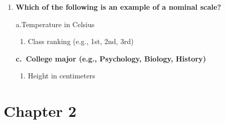 \documentclass[
  letterpaper,
  DIV=11,
  numbers=noendperiod]{scrreprt}
\providecommand{\tightlist}{%
  \setlength{\itemsep}{0pt}\setlength{\parskip}{0pt}}
\begin{document}
\begin{enumerate}
  \textbf{b. Internal validity}

  \begin{enumerate}
  \def\labelenumii{\alph{enumii}.}
  \setcounter{enumii}{2}
  \item
    Construct validity
  \item
    Content validity
  \end{enumerate}
\item
  \textbf{Which of the following is an example of a nominal scale?}

  a.Temperature in Celsius

  \begin{enumerate}
  \def\labelenumii{\alph{enumii}.}
  \setcounter{enumii}{1}
  \tightlist
  \item
    Class ranking (e.g., 1st, 2nd, 3rd)
  \end{enumerate}

  \textbf{c.~College major (e.g., Psychology, Biology, History)}

  \begin{enumerate}
  \def\labelenumii{\alph{enumii}.}
  \setcounter{enumii}{3}
  \tightlist
  \item
    Height in centimeters
  \end{enumerate}
\end{enumerate}

\section{Chapter 2}\label{chapter-2-1}
\end{document}
